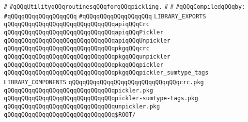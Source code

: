 \label{src/lib/compiler/src/library/pickle.lib}
\verb|#|\newline
\verb|#qQQqUtilityqQQqroutinesqQQqforqQQqpickling.|\newline
\verb|#|\newline
\verb|#|\newline
\newline
\verb|#qQQqCompiledqQQqby:|\newline
\verb|#qQQqqQQqqQQqqQQqqQQq|\newline
\verb|#qQQqqQQqqQQqqQQqqQQq|\newline
\newline
\verb|LIBRARY_EXPORTS|\newline
\newline
\verb|qQQqqQQqqQQqqQQqqQQqqQQqqQQqqQQqapiqQQqCrc|\newline
\verb|qQQqqQQqqQQqqQQqqQQqqQQqqQQqqQQqapiqQQqPickler|\newline
\verb|qQQqqQQqqQQqqQQqqQQqqQQqqQQqqQQqapiqQQqUnpickler|\newline
\newline
\verb|qQQqqQQqqQQqqQQqqQQqqQQqqQQqqQQqpkgqQQqcrc|\newline
\verb|qQQqqQQqqQQqqQQqqQQqqQQqqQQqqQQqpkgqQQqunpickler|\newline
\verb|qQQqqQQqqQQqqQQqqQQqqQQqqQQqqQQqpkgqQQqpickler|\newline
\verb|qQQqqQQqqQQqqQQqqQQqqQQqqQQqqQQqpkgqQQqpickler_sumtype_tags|\newline
\newline
\newline
\verb|LIBRARY_COMPONENTS|\newline
\newline
\verb|qQQqqQQqqQQqqQQqqQQqqQQqqQQqqQQqcrc.pkg|\newline
\verb|qQQqqQQqqQQqqQQqqQQqqQQqqQQqqQQqpickler.pkg|\newline
\verb|qQQqqQQqqQQqqQQqqQQqqQQqqQQqqQQqpickler-sumtype-tags.pkg|\newline
\verb|qQQqqQQqqQQqqQQqqQQqqQQqqQQqqQQqunpickler.pkg|\newline
\newline
\verb|qQQqqQQqqQQqqQQqqQQqqQQqqQQqqQQq$ROOT/|\newline
\newline
\newline
